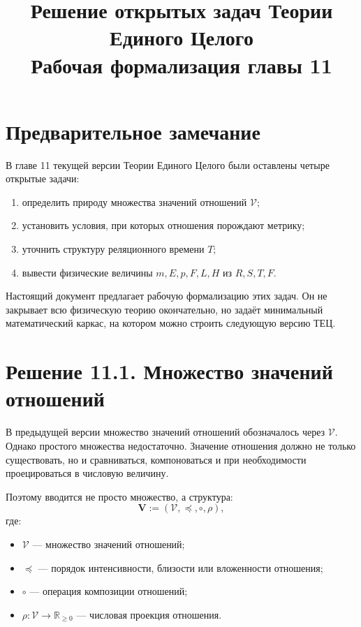 \documentclass[12pt,a4paper]{article}
\title{\textbf{Решение открытых задач Теории Единого Целого}\\[0.5em]
\large Рабочая формализация главы 11}
\author{}
\date{}
\newcommand{\Rel}{R}
\newcommand{\Values}{\mathcal V}
\newcommand{\Vstruct}{\mathbf V}
\newcommand{\State}{S}
\begin{document}
\maketitle
\tableofcontents
\newpage

\section*{Предварительное замечание}

В главе 11 текущей версии Теории Единого Целого были оставлены четыре открытые задачи:

\begin{enumerate}
    \item определить природу множества значений отношений \(\Values\);
    \item установить условия, при которых отношения порождают метрику;
    \item уточнить структуру реляционного времени \(T\);
    \item вывести физические величины \(m,E,p,F,L,H\) из \(\Rel,\State,T,F\).
\end{enumerate}

Настоящий документ предлагает рабочую формализацию этих задач. Он не закрывает всю физическую теорию окончательно, но задаёт минимальный математический каркас, на котором можно строить следующую версию ТЕЦ.

\section{Решение 11.1. Множество значений отношений}

В предыдущей версии множество значений отношений обозначалось через \(\Values\). Однако простого множества недостаточно. Значение отношения должно не только существовать, но и сравниваться, компоноваться и при необходимости проецироваться в числовую величину.

Поэтому вводится не просто множество, а структура:
\[
\Vstruct := (\Values,\preceq,\circ,\rho),
\]
где:
\begin{itemize}
    \item \(\Values\) --- множество значений отношений;
    \item \(\preceq\) --- порядок интенсивности, близости или вложенности отношения;
    \item \(\circ\) --- операция композиции отношений;
    \item \(\rho:\Values\to\mathbb R_{\ge0}\) --- числовая проекция отношения.
\end{itemize}
\end{document}
